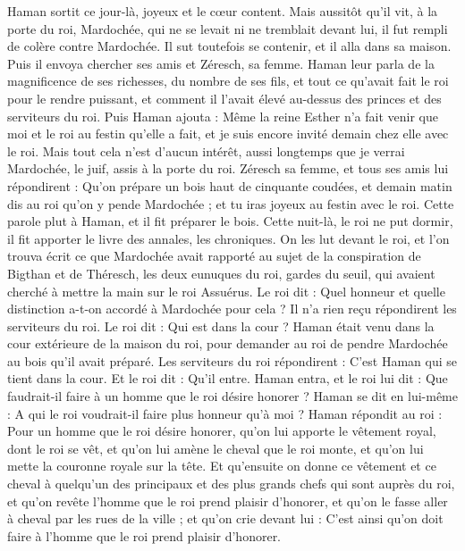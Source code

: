 \begin{multicols}{2}
Haman sortit ce jour-là, joyeux et le cœur content. Mais aussitôt qu'il vit, à la porte du roi, Mardochée, qui ne se levait ni ne tremblait devant lui, il fut rempli de colère contre Mardochée.
Il sut toutefois se contenir, et il alla dans sa maison. Puis il envoya chercher ses amis et Zéresch, sa femme.
Haman leur parla de la magnificence de ses richesses, du nombre de ses fils, et tout ce qu’avait fait le roi pour le rendre puissant, et comment il l'avait élevé au-dessus des princes et des serviteurs du roi.
Puis Haman ajouta : Même la reine Esther n'a fait venir que moi et le roi au festin qu'elle a fait, et je suis encore invité demain chez elle avec le roi.
Mais tout cela n’est d’aucun intérêt, aussi longtemps que je verrai Mardochée, le juif, assis à la porte du roi.
Zéresch sa femme, et tous ses amis lui répondirent : Qu'on prépare un bois haut de cinquante coudées, et demain matin dis au roi qu'on y pende Mardochée ; et tu iras joyeux au festin avec le roi. Cette parole plut à Haman, et il fit préparer le bois.
\VerseOne{}Cette nuit-là, le roi ne put dormir, il fit apporter le livre des annales, les chroniques. On les lut devant le roi,
et l’on trouva écrit ce que Mardochée avait rapporté au sujet de la conspiration de Bigthan et de Théresch, les deux eunuques du roi, gardes du seuil, qui avaient cherché à mettre la main sur le roi Assuérus.
Le roi dit : Quel honneur et quelle distinction a-t-on accordé à Mardochée pour cela ? Il n’a rien reçu répondirent les serviteurs du roi.
Le roi dit : Qui est dans la cour ? Haman était venu dans la cour extérieure de la maison du roi, pour demander au roi de pendre Mardochée au bois qu'il avait préparé.
Les serviteurs du roi répondirent : C’est Haman qui se tient dans la cour. Et le roi dit : Qu'il entre.
Haman entra, et le roi lui dit : Que faudrait-il faire à un homme que le roi désire honorer ? Haman se dit en lui-même : A qui le roi voudrait-il faire plus honneur qu'à moi ?
Haman répondit au roi : Pour un homme que le roi désire honorer,
qu’on lui apporte le vêtement royal, dont le roi se vêt, et qu'on lui amène le cheval que le roi monte, et qu'on lui mette la couronne royale sur la tête.
Et qu'ensuite on donne ce vêtement et ce cheval à quelqu'un des principaux et des plus grands chefs qui sont auprès du roi, et qu'on revête l'homme que le roi prend plaisir d'honorer, et qu'on le fasse aller à cheval par les rues de la ville ; et qu'on crie devant lui : C'est ainsi qu'on doit faire à l'homme que le roi prend plaisir d'honorer.

\end{multicols}
